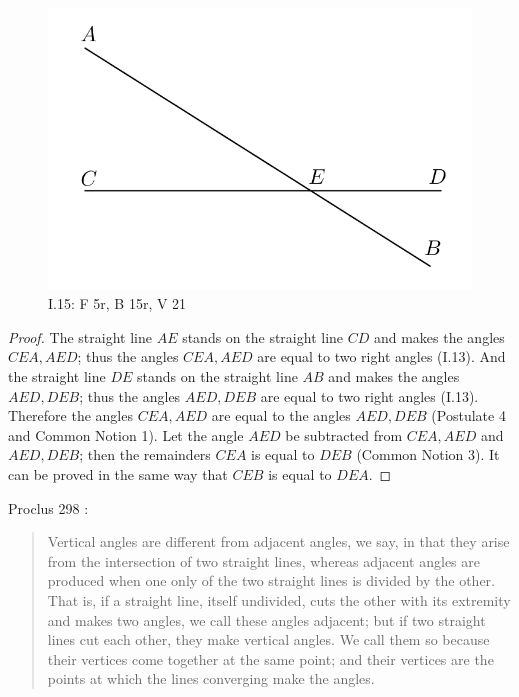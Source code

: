 \documentclass{article}
\begin{document}
\begin{figure}
\begin{center}
\includegraphics[scale=1]{I15.png}
\end{center}
\caption{I.15: F 5r, B 15r, V 21}
\label{I15}
\end{figure}

\begin{proof}
The straight line $AE$ stands on the straight line $CD$ and makes the angles
$CEA,AED$; thus the angles $CEA,AED$ are equal to two right angles (I.13).
And the straight line $DE$ stands on the straight line $AB$ and makes the angles
$AED,DEB$; thus the angles $AED,DEB$ are equal to two right angles (I.13).
Therefore the angles $CEA,AED$ are equal to the angles $AED,DEB$ (Postulate 4 and Common Notion 1).
Let the angle $AED$ be subtracted from $CEA,AED$ and $AED,DEB$; then the remainders
$CEA$ is equal to $DEB$ (Common Notion 3).
It can be proved in the same way that  $CEB$ is equal to $DEA$.
\end{proof}

Proclus 298 \cite[p.~233]{proclus}:

\begin{quote}
Vertical angles are different from adjacent angles, we say,
in that they arise from the intersection of two straight lines,
whereas adjacent angles are produced when one only of the
two straight lines is divided by the other. That is, if a straight
line, itself undivided, cuts the other with its extremity and
makes two angles, we call these angles adjacent; but if two
straight lines cut each other, they make vertical angles. We
call them so because their vertices come together at the same
point; and their vertices are the points at which the lines
converging make the angles.
\end{quote}
\end{document}
